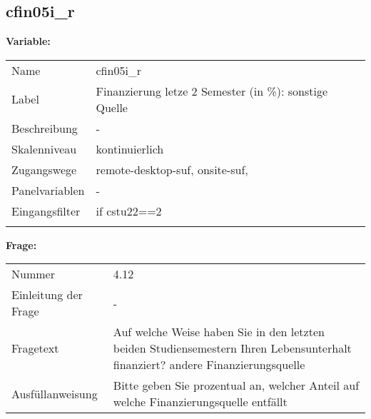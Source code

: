 	
	
	\subsection{cfin05i\_r}
	\label{subSection:cfin05i_r}

	\noindent\textbf{Variable:}\\
		\begin{tabular}{lL{11.3cm}}
			\label{tableVariable:cfin05i_r}
			Name & cfin05i\_r \\
			Label & Finanzierung letze 2 Semester (in \%): sonstige Quelle \\
			Beschreibung & - \\
			Skalenniveau & kontinuierlich \\
			Zugangswege &
				remote-desktop-suf,
				onsite-suf,
 \\
			Panelvariablen & -
			 \\
			Eingangsfilter & if cstu22==2 \\
 \\
		\end{tabular}

		\vspace*{1 cm}
		\noindent\textbf{Frage:}\\
		\begin{tabular}{lL{11.3cm}}
			\label{tableQuestion:cfin05i_r}
			Nummer & 4.12 \\
			Einleitung der Frage & - \\
			Fragetext & Auf welche Weise haben Sie in den letzten beiden Studiensemestern Ihren Lebensunterhalt finanziert?
andere Finanzierungsquelle \\
			Ausfüllanweisung & Bitte geben Sie prozentual an, welcher Anteil auf welche Finanzierungsquelle entfällt \\
		\end{tabular}




